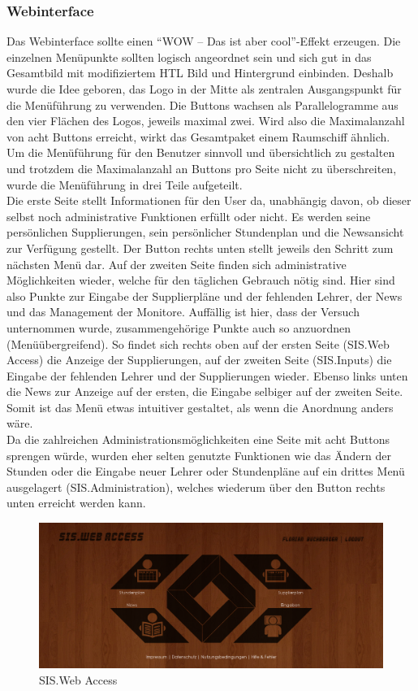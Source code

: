 \subsubsection{Webinterface}
\label{sec:content_draft_design_web}
Das Webinterface sollte einen \enquote{WOW – Das ist aber cool}-Effekt erzeugen. Die einzelnen Menüpunkte sollten logisch angeordnet sein und sich gut in das Gesamtbild mit modifiziertem HTL Bild und Hintergrund einbinden. Deshalb wurde die Idee geboren, das Logo in der Mitte als zentralen Ausgangspunkt für die Menüführung zu verwenden. Die Buttons wachsen als Parallelogramme aus den vier Flächen des Logos, jeweils maximal zwei. Wird also die Maximalanzahl von acht Buttons erreicht, wirkt das Gesamtpaket einem Raumschiff ähnlich.\\
Um die Menüführung für den Benutzer sinnvoll und übersichtlich zu gestalten und trotzdem die Maximalanzahl an Buttons pro Seite nicht zu überschreiten, wurde die Menüführung in drei Teile aufgeteilt.\\
Die erste Seite stellt Informationen für den User da, unabhängig davon, ob dieser selbst noch administrative Funktionen erfüllt oder nicht. Es werden seine persönlichen Supplierungen, sein persönlicher Stundenplan und die Newsansicht zur Verfügung gestellt. Der Button rechts unten stellt jeweils den Schritt zum nächsten Menü dar. Auf der zweiten Seite finden sich administrative Möglichkeiten wieder, welche für den täglichen Gebrauch nötig sind. Hier sind also Punkte zur Eingabe der Supplierpläne und der fehlenden Lehrer, der News und das Management der Monitore. Auffällig ist hier, dass der Versuch unternommen wurde, zusammengehörige Punkte auch so anzuordnen (Menüübergreifend). So findet sich rechts oben auf der ersten Seite (SIS.Web Access) die Anzeige der Supplierungen, auf der zweiten Seite (SIS.Inputs) die Eingabe der fehlenden Lehrer und der Supplierungen wieder. Ebenso links unten die News zur Anzeige auf der ersten, die Eingabe selbiger auf der zweiten Seite. Somit ist das Menü etwas intuitiver gestaltet, als wenn die Anordnung anders wäre.\\
Da die zahlreichen Administrationsmöglichkeiten eine Seite mit acht Buttons sprengen würde, wurden eher selten genutzte Funktionen wie das Ändern der Stunden oder die Eingabe neuer Lehrer oder Stundenpläne auf ein drittes Menü ausgelagert (SIS.Administration), welches wiederum über den Button rechts unten erreicht werden kann.\\
\begin{figure}[H]
\centering
\includegraphics[keepaspectratio=true, width=14cm]{images/screenshots/web-access_nohover.png}
\caption{SIS.Web Access}
\label{fig:content_draft_design_webaccess}
\end{figure}
